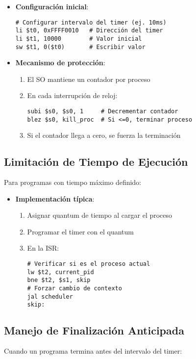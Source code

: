 \documentclass{article}
\begin{document}
\begin{itemize}
\item \textbf{Configuración inicial}:
\begin{verbatim}
# Configurar intervalo del timer (ej. 10ms)
li $t0, 0xFFFF0010   # Dirección del timer
li $t1, 10000        # Valor inicial
sw $t1, 0($t0)       # Escribir valor
\end{verbatim}

\item \textbf{Mecanismo de protección}:
\begin{enumerate}
\item El SO mantiene un contador por proceso
\item En cada interrupción de reloj:
\begin{verbatim}
subi $s0, $s0, 1     # Decrementar contador
blez $s0, kill_proc  # Si <=0, terminar proceso
\end{verbatim}
\item Si el contador llega a cero, se fuerza la terminación
\end{enumerate}
\end{itemize}

\subsection{Limitación de Tiempo de Ejecución}
Para programas con tiempo máximo definido:

\begin{itemize}
\item \textbf{Implementación típica}:
\begin{enumerate}
\item Asignar quantum de tiempo al cargar el proceso
\item Programar el timer con el quantum
\item En la ISR:
\begin{verbatim}
# Verificar si es el proceso actual
lw $t2, current_pid
bne $t2, $s1, skip
# Forzar cambio de contexto
jal scheduler
skip:
\end{verbatim}
\end{enumerate}
\end{itemize}

\subsection{Manejo de Finalización Anticipada}

Cuando un programa termina antes del intervalo del timer:
\end{document}
